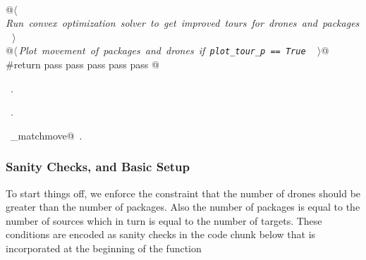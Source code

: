 \documentclass[10pt, english, oneside]{report}
\begin{document}
\begin{flushleft}
\begin{minipage}{\linewidth}
\begin{list}{}{}
\mbox{}\verb@@\\
\mbox{}\verb@     @\hbox{$\langle\,${\itshape Run convex optimization solver to get improved tours for drones and packages}\nobreak\ {\footnotesize {}}$\,\rangle$}\verb@@\\
\mbox{}\verb@     @\hbox{$\langle\,${\itshape Plot movement of packages and drones if \verb|plot_tour_p == True |}\nobreak\ {\footnotesize {}}$\,\rangle$}\verb@ @\\
\mbox{}\verb@     #return pass pass pass pass pass @\\
\mbox{}\verb@@{\NWsep}
\end{list}
\vspace{-1.5ex}
\footnotesize
\begin{list}{}{\setlength{\itemsep}{-\parsep}\setlength{\itemindent}{-\leftmargin}}
\item \NWtxtMacroDefBy\ .
\item \NWtxtMacroRefIn\ .
\item \NWtxtIdentsDefed\nobreak\  \verb@algo_matchmove@\nobreak\ .
\item{}
\end{list}
\end{minipage}\vspace{4ex}
\end{flushleft}

\subsubsection{Sanity Checks, and Basic Setup}
\label{ssec:sancheck}
To start things off, we enforce the constraint that the number of drones 
should be greater than the number of packages. Also the number of 
packages is equal to the number of sources which in turn is equal to the 
number of targets. These conditions are encoded as sanity checks 
in the code chunk below that is incorporated at the beginning of the 
function 
\end{document}
